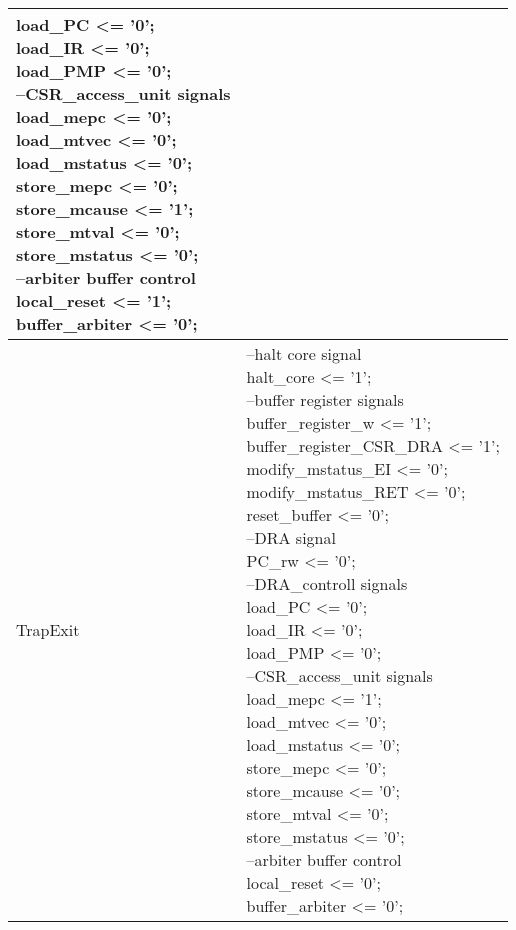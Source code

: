 \begin{longtable}{| p{} | p{} |}
{		load\_PC <= '0';\\
		load\_IR <= '0';\\
		load\_PMP <= '0';\\
		--CSR\_access\_unit signals\\
		load\_mepc <= '0';\\
		load\_mtvec <= '0';\\
		load\_mstatus <= '0';\\
		store\_mepc <= '0';\\
		store\_mcause <= '1';\\
		store\_mtval <= '0';\\
		store\_mstatus <= '0';\\
		--arbiter buffer control\\
		local\_reset <= '1';\\
		buffer\_arbiter <= '0';} \\
	\hline
	TrapExit & \makecell{--halt core signal\\
		halt\_core <= '1';\\
		--buffer register signals\\
		buffer\_register\_w <= '1';\\
		buffer\_register\_CSR\_DRA <= '1';\\
		modify\_mstatus\_EI <= '0';\\
		modify\_mstatus\_RET <= '0';\\
		reset\_buffer <= '0';\\
		--DRA signal\\
		PC\_rw <= '0';\\
		--DRA\_controll signals\\
		load\_PC <= '0';\\
		load\_IR <= '0';\\
		load\_PMP <= '0';\\
		--CSR\_access\_unit signals\\
		load\_mepc <= '1';\\
		load\_mtvec <= '0';\\
		load\_mstatus <= '0';\\
		store\_mepc <= '0';\\
		store\_mcause <= '0';\\
		store\_mtval <= '0';\\
		store\_mstatus <= '0';\\
		--arbiter buffer control\\
		local\_reset <= '0';\\
		buffer\_arbiter <= '0';} \\

\end{longtable}
